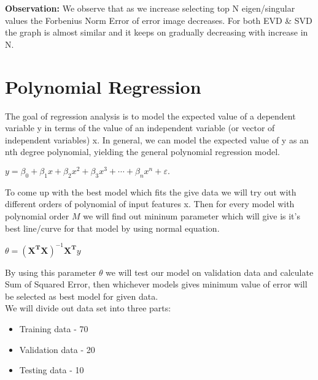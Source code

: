 \documentclass[12pt]{report}
\begin{document}
{\bfseries Observation: }
We observe that as we increase selecting top N eigen/singular values the Forbenius Norm Error of error image decreases. For both EVD \& SVD the graph is almost similar and it keeps on gradually decreasing with increase in N. \\

\cleardoublepage


\chapter{Polynomial Regression}

The goal of regression analysis is to model the expected value of a dependent variable y in terms of the value of an independent variable (or vector of independent variables) x. In general, we can model the expected value of y as an nth degree polynomial, yielding the general polynomial regression model.

\begin{center}
	$ {\displaystyle y=\beta _{0}+\beta _{1}x+\beta _{2}x^{2}+\beta _{3}x^{3}+\cdots +\beta _{n}x^{n}+\varepsilon .\,} $\\
\end{center}

To come up with the best model which fits the give data we will try out with different orders of polynomial of input features x. Then for every model with polynomial order $ M $ we will find out mininum parameter which will give is it's best line/curve for that model by using normal equation.

\begin{center}
	$ {\displaystyle { {\theta }=(\mathbf {X} ^{\mathbf {T}}\mathbf {X} )^{-1} \mathbf {X} ^{\mathbf {T}} {y}}} $
\end{center}

By using this parameter $ {\theta } $ we will test our model on validation data and calculate Sum of Squared Error, then whichever models gives minimum value of error will be selected as best model for given data.\\

We will divide out data set into three parts:

\begin{itemize}
	\item Training data - 70%
	\item Validation data - 20%
	\item Testing data - 10%
\end{itemize}
\end{document}
